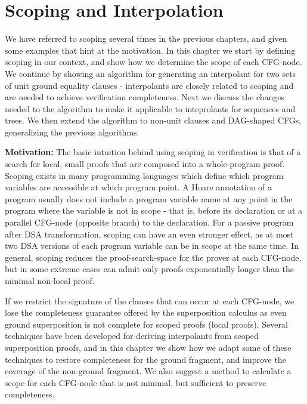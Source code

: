 \chapter{Scoping and Interpolation}\label{chapter:scoping}
We have referred to scoping several times in the previous chapters, and given some examples that hint at the motivation. 
In this chapter we start by defining scoping in our context, and show how we determine the scope of each CFG-node.
We continue by showing an algorithm for generating an interpolant for two sets of unit ground equality clauses - interpolants are closely related to scoping and are needed to achieve verification completeness.
Next we discuss the changes needed to the algorithm to make it applicable to inteprolants for sequences and trees.
We then extend the algorithm to non-unit clauses and DAG-shaped CFGs, generalizing the previous algorithms.

\textbf{Motivation:}
The basic intuition behind using scoping in verification is that of a search for local, small proofs that are composed into a whole-program proof.
Scoping exists in many programming languages which define which program variables are accessible at which program point.
A Hoare annotation of a program usually does not include a program variable name at any point in the program where the variable is not in scope - that is, before its declaration or at a parallel CFG-node (opposite branch) to the declaration.
For a passive program after DSA transformation, scoping can have an even stronger effect, as at most two DSA versions of each program variable can be in scope at the same time. In general, scoping reduces the proof-search-space for the prover at each CFG-node, but in some extreme cases can admit only proofs exponentially longer than the minimal non-local proof.

If we restrict the signature of the clauses that can occur at each CFG-node, 
we lose the completeness guarantee offered by the superposition calculus as even ground superposition is not complete for scoped proofs (local proofs). Several techniques have been developed for deriving interpolants from scoped superposition proofs, and in this chapter we show how we adapt some of these techniques to restore completeness for the ground fragment, and improve the coverage of the non-ground fragment. We also suggest a method to calculate a scope for each CFG-node that is not minimal, but sufficient to preserve completeness.





